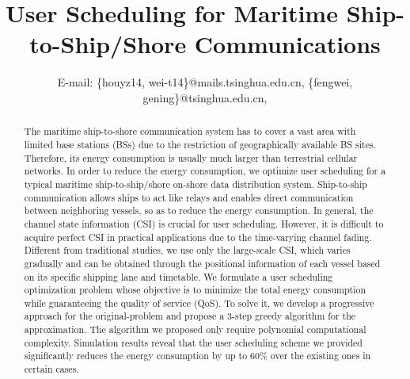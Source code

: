 \documentclass[conference]{IEEEtran}
\begin{document}
 \title{User Scheduling for Maritime Ship-to-Ship/Shore Communications}
 
 \author{
  E-mail: \{houyz14, wei-t14\}@mails.tsinghua.edu.cn, \{fengwei, gening\}@tsinghua.edu.cn, %
 }
 
 
 
 
 
 \maketitle
 
 \begin{abstract}
 
 The maritime ship-to-shore communication system has to cover a vast area with limited base stations (BSs) due to the restriction of geographically available BS sites. Therefore, its energy consumption is usually much larger than terrestrial cellular networks. In order to reduce the energy consumption, we optimize user scheduling for a typical maritime ship-to-ship/shore on-shore data distribution system. Ship-to-ship communication allows ships to act like relays and enables direct communication between neighboring vessels, so as to reduce the energy consumption. 
 In general, the channel state information (CSI) is crucial for user scheduling. However, it is difficult to acquire perfect CSI in practical applications due to the time-varying channel fading. Different from traditional studies, we use only the large-scale CSI, which varies gradually and can be obtained through the positional information of each vessel based on its specific shipping lane and timetable. 
 We formulate a user scheduling optimization problem whose objective is to minimize the total energy consumption while guaranteeing the quality of service (QoS). To solve it, we develop a progressive approach for the original-problem and propose a 3-step greedy algorithm for the approximation. The algorithm we proposed only require polynomial computational complexity. Simulation results reveal that the user scheduling scheme we provided significantly reduces the energy consumption by up to 60\% over the existing ones in certain cases.
 \end{abstract}
 
\end{document}

